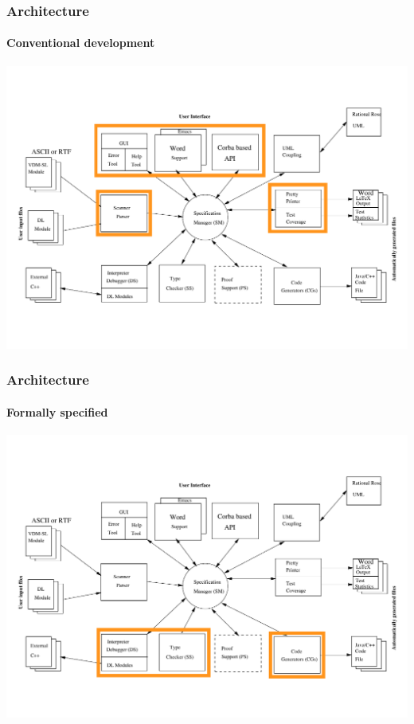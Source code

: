 \documentclass[slidestop,uncompress,mathserif,notes]{beamer}
\newcommand{\pgl}[0]{Peter Gorm Larsen}
\begin{document}
\begin{frame}[c]
  \frametitle{Architecture}
  \framesubtitle{Conventional development}

  \begin{center}
    \includegraphics[width=\textwidth]{images/vdmtools_arch_conv_dev.pdf}
  \end{center}
\end{frame}

\begin{frame}[c]
  \frametitle{Architecture}
  \framesubtitle{Formally specified}

  \begin{center}
    \includegraphics[width=\textwidth]{images/vdmtools_arch_spec.pdf}
  \end{center}
\end{frame}
\end{document}
